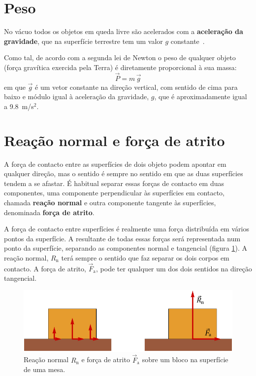 \documentclass[a4paper,12pt,twosided]{report}
\begin{document}
\section{Peso}
No vácuo todos os objetos em queda livre são acelerados com a
\textbf{aceleração da gravidade}, que na superfície terrestre tem um
valor $g$ constante~\cite{French}.

Como tal, de acordo com a segunda lei de Newton o peso de qualquer
objeto (força gravítica exercida pela Terra) é diretamente
proporcional à sua massa:
\begin{equation}
  \vec{P} = m\,\vec{g}
\end{equation}
em que $\vec{g}$ é um vetor constante na direção vertical, com sentido
de cima para baixo e módulo igual à aceleração da gravidade, $g$, que
é aproximadamente igual a 9.8~m/s$^{2}$.

\section{Reação normal e força de atrito}

A força de contacto entre as superfícies de dois objeto podem apontar
em qualquer direção, mas o sentido é sempre no sentido em que as duas
superfícies tendem a se afastar.  É habitual separar essas forças de
contacto em duas componentes, uma componente perpendicular às
superfícies em contacto, chamada \textbf{reação normal} e outra
componente tangente às superfícies, denominada \textbf{força de
  atrito}.

A força de contacto entre superfícies é realmente uma força
distribuída em vários pontos da superfície. A resultante de todas
essas forças será representada num ponto da superfície, separando as
componentes normal e tangencial (figura \ref{fig:contacto}). A reação
normal, $R_\mathrm{n}$ terá sempre o sentido que faz separar os dois
corpos em contacto. A força de atrito, $\vec{F}_\mathrm{a}$, pode ter
qualquer um dos dois sentidos na direção tangencial.

\begin{figure}[hbt]
\centering
\includegraphics{normal_e_atrito.pdf}
\caption[Reação normal e força de atrito]{Reação normal $R_\mathrm{n}$
e força de atrito $\vec{F}_\mathrm{a}$ sobre um bloco na superfície
de uma mesa.}
\label{fig:contacto}
\end{figure}
\end{document}
